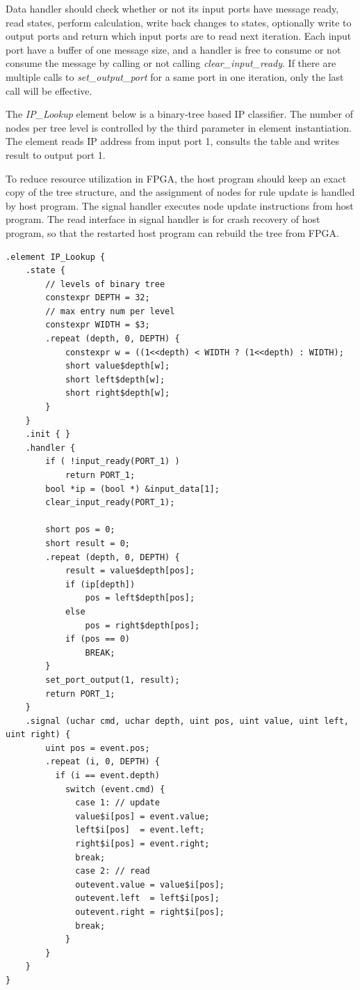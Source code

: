Data handler should check whether or not its input ports have message ready, read states, perform calculation, write back changes to states, optionally write to output ports and return which input ports are to read next iteration. Each input port have a buffer of one message size, and a handler is free to consume or not consume the message by calling or not calling \textit{clear\_input\_ready}. If there are multiple calls to \textit{set\_output\_port} for a same port in one iteration, only the last call will be effective.

The \textit{IP\_Lookup} element below is a binary-tree based IP classifier. The number of nodes per tree level is controlled by the third parameter in element instantiation. The element reads IP address from input port 1, consults the table and writes result to output port 1.

To reduce resource utilization in FPGA, the host program should keep an exact copy of the tree structure, and the assignment of nodes for rule update is handled by host program. The signal handler executes node update instructions from host program. The read interface in signal handler is for crash recovery of host program, so that the restarted host program can rebuild the tree from FPGA.

\begin{lstlisting}
.element IP_Lookup {
    .state {
        // levels of binary tree
        constexpr DEPTH = 32;
        // max entry num per level
        constexpr WIDTH = $3;
        .repeat (depth, 0, DEPTH) {
            constexpr w = ((1<<depth) < WIDTH ? (1<<depth) : WIDTH);
            short value$depth[w];
            short left$depth[w];
            short right$depth[w];
        }
    }
    .init { }
    .handler {
        if ( !input_ready(PORT_1) )
            return PORT_1;
        bool *ip = (bool *) &input_data[1];
        clear_input_ready(PORT_1);

        short pos = 0;
        short result = 0;
        .repeat (depth, 0, DEPTH) {
            result = value$depth[pos];
            if (ip[depth])
                pos = left$depth[pos];
            else
                pos = right$depth[pos];
            if (pos == 0)
                BREAK;
        }
        set_port_output(1, result);
        return PORT_1;
    }
    .signal (uchar cmd, uchar depth, uint pos, uint value, uint left, uint right) {
        uint pos = event.pos;
        .repeat (i, 0, DEPTH) {
          if (i == event.depth)
            switch (event.cmd) {
              case 1: // update
              value$i[pos] = event.value;
              left$i[pos]  = event.left;
              right$i[pos] = event.right;
              break;
              case 2: // read
              outevent.value = value$i[pos];
              outevent.left  = left$i[pos];
              outevent.right = right$i[pos];
              break;
            }
        }
    }
}
\end{lstlisting}

